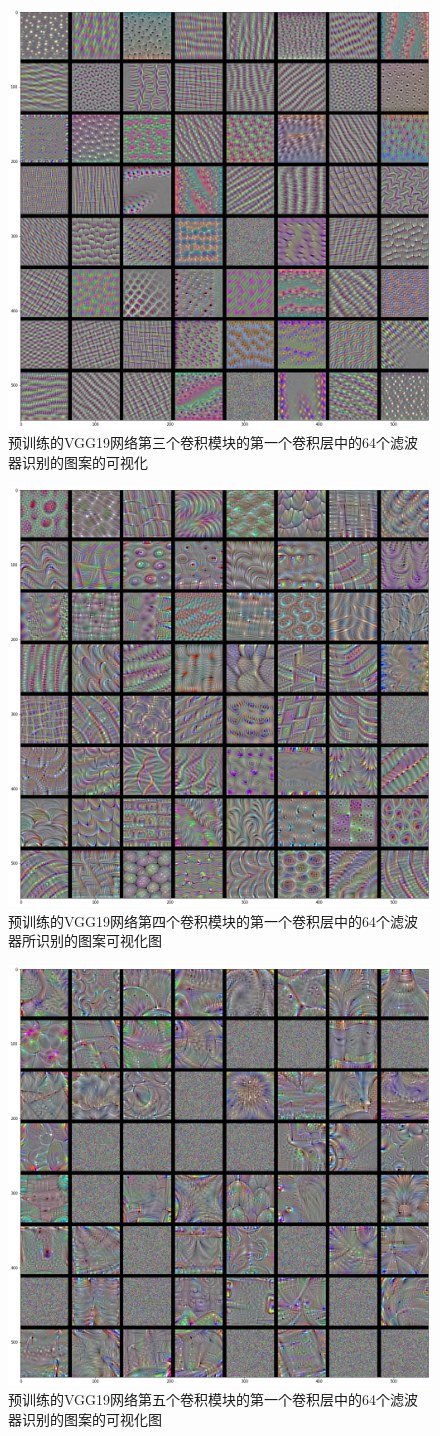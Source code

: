 \documentclass[lang=cn,11pt]{elegantpaper}
\begin{document}
\begin{figure}
	\centering
	\includegraphics[width=0.5\linewidth]
	{block3_conv1}
	\caption{预训练的VGG19网络第三个卷积模块的第一个卷积层中的64个滤波器识别的图案的可视化\label{fig:filter3}}
\end{figure}
\begin{figure}
	\centering
  \includegraphics[width=0.5\linewidth]{block4_conv1}
  \caption{预训练的VGG19网络第四个卷积模块的第一个卷积层中的64个滤波器所识别的图案可视化图\label{fig:filter4}}
\end{figure}
\begin{figure}
\centering
  \includegraphics[width=0.5\linewidth]{block5_conv1.png}
  \caption{预训练的VGG19网络第五个卷积模块的第一个卷积层中的64个滤波器识别的图案的可视化图\label{fig:filter5}}
\end{figure}
\end{document}
